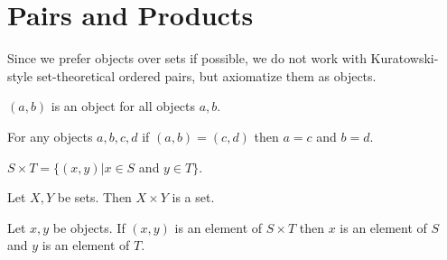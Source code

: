 \documentclass[11pt]{article}
\begin{document}
\section{Pairs and Products}
Since we prefer objects over sets if possible, we do not work
with Kuratowski-style set-theoretical ordered pairs, but
axiomatize them as objects.

\begin{forthel}

\begin{axiom}
$(a,b)$ is an object for all objects $a,b$.
\end{axiom}

\begin{axiom}
For any objects $a,b,c,d$ if $(a,b) = (c,d)$ then $a = c$
and $b = d$.
\end{axiom}

\begin{definition}
$S \times T = \{(x,y) | x \in S$ and $y \in T\}$.
\end{definition}

\begin{axiom} Let $X,Y$ be sets. Then
$X \times Y$ is a set.
\end{axiom}

\begin{lemma}
Let $x,y$ be objects.
If $(x,y)$ is an element of $S \times T$ then $x$ is an
element of $S$ and $y$ is an element of $T$.
\end{lemma}

\end{forthel}
\end{document}
